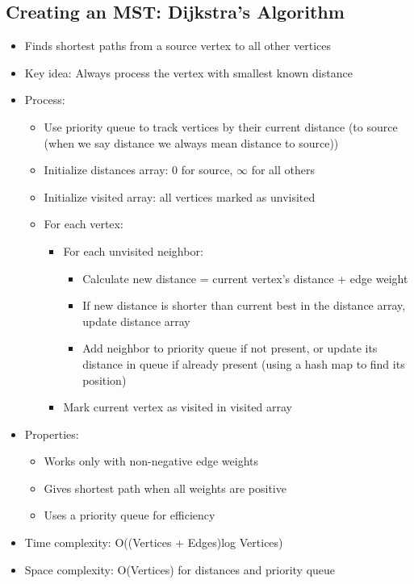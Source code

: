 \documentclass[11pt,a4paper]{article}
\begin{document}
\begin{multicols}{2}
\subsection{Creating an MST: Dijkstra's Algorithm}
\begin{itemize}
    \item Finds shortest paths from a source vertex to all other vertices
    \item Key idea: Always process the vertex with smallest known distance
    \item Process:
    \begin{itemize}
        \item Use priority queue to track vertices by their current distance (to source (when we say distance we always mean distance to source))
        \item Initialize distances array: 0 for source, $\infty$ for all others
        \item Initialize visited array: all vertices marked as unvisited
        \item For each vertex:
        \begin{itemize}
            \item For each unvisited neighbor:
            \begin{itemize}
                \item Calculate new distance = current vertex's distance + edge weight
                \item If new distance is shorter than current best in the distance array, update distance array
                \item Add neighbor to priority queue if not present, or update its distance in queue if already present (using a hash map to find its position)
            \end{itemize}
            \item Mark current vertex as visited in visited array
        \end{itemize}
    \end{itemize}
    \item Properties:
    \begin{itemize}
        \item Works only with non-negative edge weights
        \item Gives shortest path when all weights are positive
        \item Uses a priority queue for efficiency
    \end{itemize}
    \item Time complexity: O((Vertices + Edges)log Vertices)
    \item Space complexity: O(Vertices) for distances and priority queue
\end{itemize}


\end{multicols}
\end{document}
